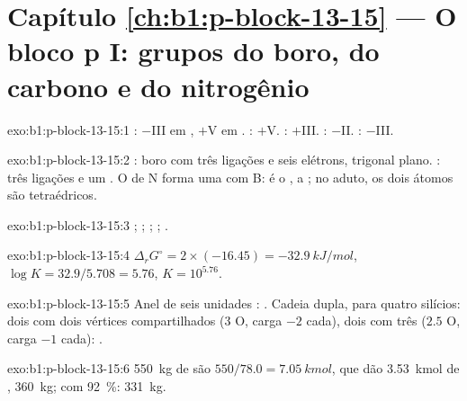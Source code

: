 \section*{Capítulo \ref{ch:b1:p-block-13-15} --- O bloco p I: grupos do boro, do carbono e do nitrogênio}

\begin{solution}{exo:b1:p-block-13-15:1}
: $-$III em , $+$V em . : $+$V.
: $+$III. : $-$II. : $-$III.
\end{solution}

\begin{solution}{exo:b1:p-block-13-15:2}
: boro com três ligações e seis elétrons, trigonal plano.
: três ligações e um . O  de N forma
uma  com B:  é o ,  a ; no aduto, os dois átomos são tetraédricos.
\end{solution}

\begin{solution}{exo:b1:p-block-13-15:3}
; ;
; ;
.
\end{solution}

\begin{solution}{exo:b1:p-block-13-15:4}
$\Delta_r G^\circ = 2 \times (-16.45) = \qty{-32.9}{kJ/mol}$, $\log K =
32.9/5.708 = 5.76$, $K = 10^{5.76}$.
\end{solution}

\begin{solution}{exo:b1:p-block-13-15:5}
Anel de seis unidades : . Cadeia dupla, para
quatro silícios: dois com dois vértices compartilhados (3 O, carga $-2$
cada), dois com três ($2.5$ O, carga $-1$ cada): .
\end{solution}

\begin{solution}{exo:b1:p-block-13-15:6}
\qty{550}{kg} de  são $550/78.0 = \qty{7.05}{kmol}$, que dão
\qty{3.53}{kmol} de , \qty{360}{kg}; com \qty{92}{\percent}:
\qty{331}{kg}.
\end{solution}

